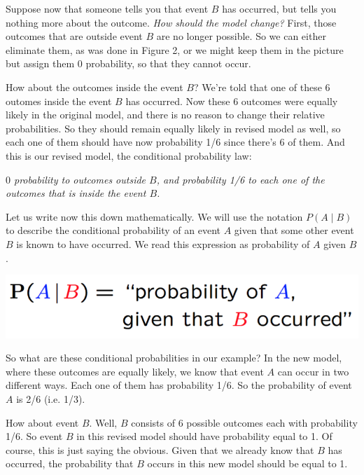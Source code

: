 \documentclass{tufte-handout}
\begin{document}
Suppose now that someone tells you that event $B$ has occurred, but tells you nothing more about the
outcome. \textit{How should the model change?} First, those outcomes that are outside event $B$ are no longer
possible. So we can either eliminate them, as was done in Figure 2, or we might keep them in the
picture but assign them 0 probability, so that they cannot occur.

How about the outcomes inside the event $B$? We're told that one of these 6 outomes inside the event $B$ 
has occurred. Now these 6 outcomes were equally likely in the original model, and there is no reason to change
their relative probabilities. So they should remain equally likely in revised model as well, so each one of
them should have now probability 1/6 since there's 6 of them. And this is our revised model, the
conditional probability law: 

\vspace{3mm}
\textit{$0$ probability to outcomes outside $B$, and probability 1/6 to each one of the
outcomes that is inside the event $B$.}
\vspace{3mm}

Let us write now this down mathematically. We will use the notation $P(A \mid B)$ to describe the conditional
probability of an event $A$ given that some other event $B$ is known to have occurred. We read this
expression as probability of $A$ given $B$. \begin{marginfigure}
  \includegraphics{CondFormula}
\end{marginfigure}So what are these conditional probabilities in our example? In
the new model, where these outcomes are equally likely, we know that event $A$ can occur in two
different ways. Each one of them has probability 1/6. So the probability of event $A$ is 2/6 (i.e. 1/3).



How about event $B$. Well, $B$ consists of 6 possible outcomes each with probability 1/6. So event $B$ in this
revised model should have probability equal to 1. Of course, this is just saying the obvious. Given that
we already know that $B$ has occurred, the probability that $B$ occurs in this new model should be equal to
1. 
\end{document}
